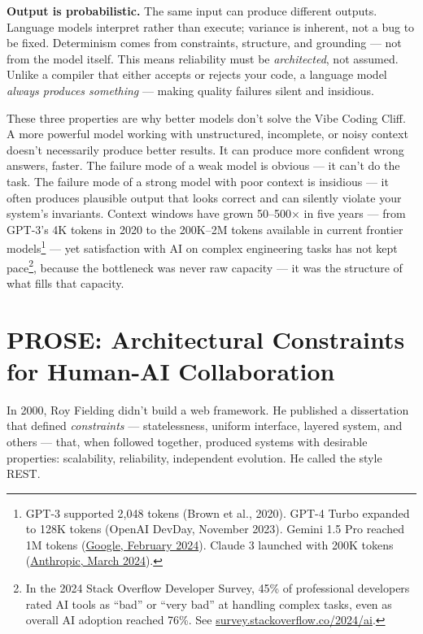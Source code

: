 \documentclass[
  a4paper,
  DIV=11,
  numbers=noendperiod]{scrreprt}
\begin{document}
\textbf{Output is probabilistic.} The same input can produce different
outputs. Language models interpret rather than execute; variance is
inherent, not a bug to be fixed. Determinism comes from constraints,
structure, and grounding --- not from the model itself. This means
reliability must be \emph{architected}, not assumed. Unlike a compiler
that either accepts or rejects your code, a language model \emph{always
produces something} --- making quality failures silent and insidious.

These three properties are why better models don't solve the Vibe Coding
Cliff. A more powerful model working with unstructured, incomplete, or
noisy context doesn't necessarily produce better results. It can produce
more confident wrong answers, faster. The failure mode of a weak model
is obvious --- it can't do the task. The failure mode of a strong model
with poor context is insidious --- it often produces plausible output
that looks correct and can silently violate your system's invariants.
Context windows have grown 50--500× in five years --- from GPT-3's 4K
tokens in 2020 to the 200K--2M tokens available in current frontier
models\footnote{GPT-3 supported 2,048 tokens (Brown et al., 2020). GPT-4
  Turbo expanded to 128K tokens (OpenAI DevDay, November 2023). Gemini
  1.5 Pro reached 1M tokens
  (\href{https://blog.google/technology/ai/google-gemini-next-generation-model-february-2024/}{Google,
  February 2024}). Claude 3 launched with 200K tokens
  (\href{https://www.anthropic.com/news/claude-3-family}{Anthropic,
  March 2024}).} --- yet satisfaction with AI on complex engineering
tasks has not kept pace\footnote{In the 2024 Stack Overflow Developer
  Survey, 45\% of professional developers rated AI tools as ``bad'' or
  ``very bad'' at handling complex tasks, even as overall AI adoption
  reached 76\%. See
  \href{https://survey.stackoverflow.co/2024/ai}{survey.stackoverflow.co/2024/ai}.},
because the bottleneck was never raw capacity --- it was the structure
of what fills that capacity.

\section{PROSE: Architectural Constraints for Human-AI
Collaboration}\label{prose-architectural-constraints-for-human-ai-collaboration}

In 2000, Roy Fielding didn't build a web framework. He published a
dissertation that defined \emph{constraints} --- statelessness, uniform
interface, layered system, and others --- that, when followed together,
produced systems with desirable properties: scalability, reliability,
independent evolution. He called the style REST.
\end{document}

